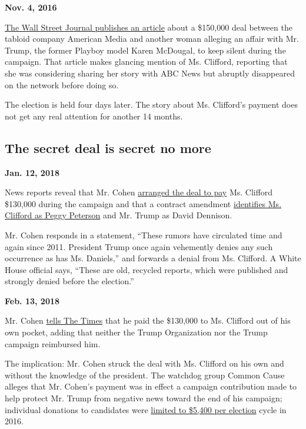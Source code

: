 \textbf{Nov. 4, 2016}

\href{https://www.wsj.com/articles/national-enquirer-shielded-donald-trump-from-playboy-models-affair-allegation-1478309380}{The
Wall Street Journal publishes an article} about a \$150,000 deal between
the tabloid company American Media and another woman alleging an affair
with Mr. Trump, the former Playboy model Karen McDougal, to keep silent
during the campaign. That article makes glancing mention of Ms.
Clifford, reporting that she was considering sharing her story with ABC
News but abruptly disappeared on the network before doing so.

The election is held four days later. The story about Ms. Clifford's
payment does not get any real attention for another 14 months.

\hypertarget{the-secret-deal-is-secret-no-more}{%
\subsection{The secret deal is secret no
more}\label{the-secret-deal-is-secret-no-more}}

\textbf{Jan. 12, 2018}

News reports reveal that Mr. Cohen
\href{https://www.wsj.com/articles/trump-lawyer-arranged-130-000-payment-for-adult-film-stars-silence-1515787678}{arranged
the deal to pay} Ms. Clifford \$130,000 during the campaign and that a
contract amendment
\href{https://www.nytimes3xbfgragh.onion/2018/01/12/us/trump-stephanie-clifford-stormy-daniels.html}{identifies
Ms. Clifford as Peggy Peterson} and Mr. Trump as David Dennison.

Mr. Cohen responds in a statement, ``These rumors have circulated time
and again since 2011. President Trump once again vehemently denies any
such occurrence as has Ms. Daniels,'' and forwards a denial from Ms.
Clifford. A White House official says, ``These are old, recycled
reports, which were published and strongly denied before the election.''

\textbf{Feb. 13, 2018}

Mr. Cohen
\href{https://www.nytimes3xbfgragh.onion/2018/02/13/us/politics/stormy-daniels-michael-cohen-trump.html}{tells
The Times} that he paid the \$130,000 to Ms. Clifford out of his own
pocket, adding that neither the Trump Organization nor the Trump
campaign reimbursed him.

The implication: Mr. Cohen struck the deal with Ms. Clifford on his own
and without the knowledge of the president. The watchdog group Common
Cause alleges that Mr. Cohen's payment was in effect a campaign
contribution made to help protect Mr. Trump from negative news toward
the end of his campaign; individual donations to candidates were
\href{https://blogs.wsj.com/washwire/2015/02/02/fec-raises-contribution-caps-for-2016/}{limited
to \$5,400 per election} cycle in 2016.

